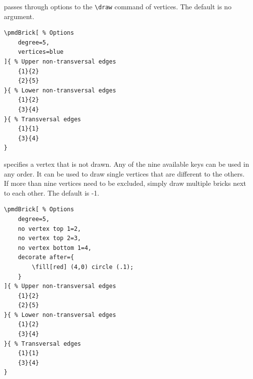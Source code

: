 \documentclass{ltxdoc}
\begin{document}
passes through options to the \verb`\draw` command of vertices. The default is no argument.
\begin{center}
    \begin{minipage}{\dimexpr0.85\textwidth-2\fboxrule-2\fboxsep\relax}
        \begin{minipage}[c]{0.4\linewidth}
\begin{verbatim}
\pmdBrick[ % Options
    degree=5,
    vertices=blue
]{ % Upper non-transversal edges
    {1}{2}
    {2}{5}
}{ % Lower non-transversal edges
    {1}{2}
    {3}{4}
}{ % Transversal edges
    {1}{1}
    {3}{4}
}
\end{verbatim}
        \end{minipage}
        \hfill
        \begin{minipage}[c]{0.4\linewidth}
        \end{minipage}
    \end{minipage}%
\end{center}

\DescribeMacro{ \vdots}
\DescribeMacro{ \vdots}
specifies a vertex that is not drawn. Any of the nine available keys can be used in any order. It can be used to draw single vertices that are different to the others. If more than nine vertices need to be excluded, simply draw multiple bricks next to each other. The default is -1.
\begin{center}
    \begin{minipage}{\dimexpr0.85\textwidth-2\fboxrule-2\fboxsep\relax}
        \begin{minipage}[c]{0.4\linewidth}
\begin{verbatim}
\pmdBrick[ % Options
    degree=5,
    no vertex top 1=2,
    no vertex top 2=3,
    no vertex bottom 1=4,
    decorate after={
        \fill[red] (4,0) circle (.1);
    }
]{ % Upper non-transversal edges
    {1}{2}
    {2}{5}
}{ % Lower non-transversal edges
    {1}{2}
    {3}{4}
}{ % Transversal edges
    {1}{1}
    {3}{4}
}
\end{verbatim}
        \end{minipage}
        \hfill
        \begin{minipage}[c]{0.4\linewidth}
        \end{minipage}
    \end{minipage}%
\end{center}
\begin{center}
\end{center}
\end{document}
